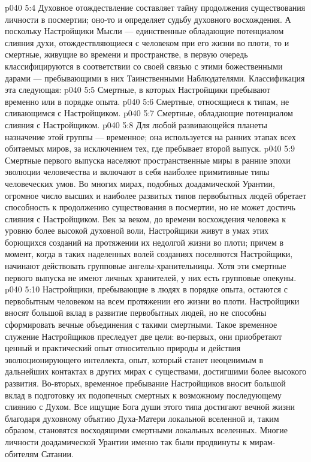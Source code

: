 \vs p040 5:4 \pc Духовное отождествление составляет тайну продолжения существования личности в посмертии; оно\hyp{}то и определяет судьбу духовного восхождения. А поскольку Настройщики Мысли --- единственные обладающие потенциалом слияния духи, отождествляющиеся с человеком при его жизни во плоти, то и смертные, живущие во времени и пространстве, в первую очередь классифицируются в соответствии со своей связью с этими божественными дарами --- пребывающими в них Таинственными Наблюдателями. Классификация эта следующая:
\vs p040 5:5 \bibnobreakspace Смертные, в которых Настройщики пребывают временно или в порядке опыта.
\vs p040 5:6 \bibnobreakspace Смертные, относящиеся к типам, не сливающимся с Настройщиком.
\vs p040 5:7 \bibnobreakspace Смертные, обладающие потенциалом слияния с Настройщиком.
\vs p040 5:8 \pc {} Для любой развивающейся планеты назначение этой группы --- временное; она используется на ранних этапах всех обитаемых миров, за исключением тех, где пребывает второй выпуск.
\vs p040 5:9 Смертные первого выпуска населяют пространственные миры в ранние эпохи эволюции человечества и включают в себя наиболее примитивные типы человеческих умов. Во многих мирах, подобных доадамической Урантии, огромное число высших и наиболее развитых типов первобытных людей обретает способность к продолжению существования в посмертии, но не может достичь слияния с Настройщиком. Век за веком, до времени восхождения человека к уровню более высокой духовной воли, Настройщики живут в умах этих борющихся созданий на протяжении их недолгой жизни во плоти; причем в момент, когда в таких наделенных волей созданиях поселяются Настройщики, начинают действовать групповые ангелы\hyp{}хранительницы. Хотя эти смертные первого выпуска не имеют личных хранителей, у них есть групповые опекуны.
\vs p040 5:10 Настройщики, пребывающие в людях в порядке опыта, остаются с первобытным человеком на всем протяжении его жизни во плоти. Настройщики вносят большой вклад в развитие первобытных людей, но не способны сформировать вечные объединения с такими смертными. Такое временное служение Настройщиков преследует две цели: во\hyp{}первых, они приобретают ценный и практический опыт относительно природы и действия эволюционирующего интеллекта, опыт, который станет неоценимым в дальнейших контактах в других мирах с существами, достигшими более высокого развития. Во\hyp{}вторых, временное пребывание Настройщиков вносит большой вклад в подготовку их подопечных смертных к возможному последующему слиянию с Духом. Все ищущие Бога души этого типа достигают вечной жизни благодаря духовному объятию Духа\hyp{}Матери локальной вселенной и, таким образом, становятся восходящими смертными локальных вселенных. Многие личности доадамической Урантии именно так были продвинуты к мирам\hyp{}обителям Сатании.
